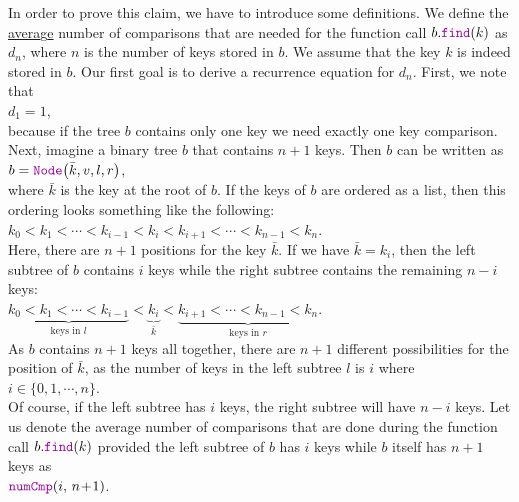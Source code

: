 In order to prove this claim, we have to introduce some definitions.
We define the \underline{avera}g\underline{e} number of comparisons that are needed for the function
call $b.\mytt{find}(k)$ as  $d_n$, where $n$ is the number of keys stored in $b$.  We assume that
the key $k$ is indeed stored in $b$.  Our first goal is to derive a recurrence equation for 
$d_n$.  First, we note that  
\\[0.2cm]
\hspace*{1.3cm} $d_1 = 1$,
\\[0.2cm]
because if the tree $b$ contains only one key we need exactly one key comparison.
Next, imagine a binary tree $b$ that contains $n+1$ keys.  Then $b$
can be written as 
\\[0.2cm]
\hspace*{1.3cm}
$b = \mytt{Node}\bigl(\bar{k},v,l,r\bigr)$,
\\[0.2cm]
where $\bar{k}$ is the key at the root of $b$.  If the keys of $b$ are ordered as a list, then this
ordering looks something like the following:
\\[0.2cm]
\hspace*{1.3cm}
$k_0 < k_1 < \cdots < k_{i-1} < k_{i} < k_{i+1} < \cdots < k_{n-1} < k_n$.
\\[0.2cm]
Here, there are $n+1$ positions for the key $\bar{k}$.
If we have $\bar{k} = k_i$, then the left subtree of $b$ contains  $i$ keys while the right subtree
contains the remaining  $n-i$ keys:
\\[0.2cm]
\hspace*{1.3cm}
$\underbrace{k_0 < k_1 < \cdots < k_{i-1}}_{\mbox{keys in $l$}} < 
 \underbrace{k_{i}}_{\displaystyle \bar{k}} < 
 \underbrace{k_{i+1} < \cdots < k_{n-1} < k_n}_{\mbox{keys in $r$}}$.
\\[0.2cm]
As  $b$ contains $n+1$ keys all together, there are  $n+1$ different possibilities for the position
of $\bar{k}$, as the number of keys in the left subtree $l$ is $i$ where
\\[0.2cm]
\hspace*{1.3cm}
 $i \in \{0,1, \cdots, n\}$.
\\[0.2cm]
Of course, if the left subtree has $i$ keys, the right subtree will have $n-i$ keys.
Let us denote the average number of comparisons that are done during the function call
$b.\mytt{find}(k)$ provided the left subtree of $b$ has $i$ keys while $b$ itself has $n+1$ keys
as
\\[0.2cm]
\hspace*{1.3cm}
$\mytt{numCmp}(i,\, n\!+\!1)$.

